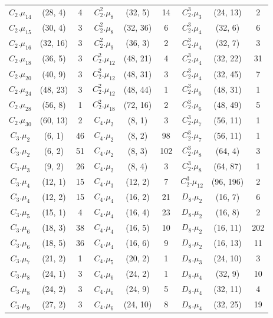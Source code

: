 {\begin{longtable}{ccc|ccc|ccc}
$C_2.\mu_{14}$&(28, 4)&4 & $C_2^2.\mu_{8}$&(32, 5)&14 & $C_2^3.\mu_{3}$&(24, 13)&2\\
\rowcolor{lightgray}
$C_2.\mu_{15}$&(30, 4)&3 & $C_2^2.\mu_{8}$&(32, 36)&6 & $C_2^3.\mu_{4}$&(32, 6)&6\\
$C_2.\mu_{16}$&(32, 16)&3 & $C_2^2.\mu_{9}$&(36, 3)&2 & $C_2^3.\mu_{4}$&(32, 7)&3\\
\rowcolor{lightgray}
$C_2.\mu_{18}$&(36, 5)&3   &  $C_2^2.\mu_{12}$&(48, 21)&4 & $C_2^3.\mu_{4}$&(32, 22)&31\\
$C_2.\mu_{20}$&(40, 9)&3   &  $C_2^2.\mu_{12}$&(48, 31)&3 & $C_2^3.\mu_{4}$&(32, 45)&7\\
\rowcolor{lightgray}
$C_2.\mu_{24}$&(48, 23)&3  &  $C_2^2.\mu_{12}$&(48, 44)&1 & $C_2^3.\mu_{6}$&(48, 31)&1\\
$C_2.\mu_{28}$&(56, 8)&1   &  $C_2^2.\mu_{18}$&(72, 16)&2 & $C_2^3.\mu_{6}$&(48, 49)&5\\
\rowcolor{lightgray}
$C_2.\mu_{30}$&(60, 13)&2  &  $C_4.\mu_{2}$&(8, 1)&3 & $C_2^3.\mu_{7}$&(56, 11)&1\\
$C_3.\mu_{2}$&(6, 1)&46    &  $C_4.\mu_{2}$&(8, 2)&98 & $C_2^3.\mu_{7}$&(56, 11)&1\\
\rowcolor{lightgray}
$C_3.\mu_{2}$&(6, 2)&51    &  $C_4.\mu_{2}$&(8, 3)&102 & $C_2^3.\mu_{8}$&(64, 4)&3\\
$C_3.\mu_{3}$&(9, 2)&26    &  $C_4.\mu_{2}$&(8, 4)&3 & $C_2^3.\mu_{8}$&(64, 87)&1\\
\rowcolor{lightgray}
$C_3.\mu_{4}$&(12, 1)&15   &  $C_4.\mu_{3}$&(12, 2)&7 & $C_2^3.\mu_{12}$&(96, 196)&2\\
$C_3.\mu_{4}$&(12, 2)&15   &  $C_4.\mu_{4}$&(16, 2)&21 & $D_8.\mu_{2}$&(16, 7)&6\\
\rowcolor{lightgray}
$C_3.\mu_{5}$&(15, 1)&4    &  $C_4.\mu_{4}$&(16, 4)&23 & $D_8.\mu_{2}$&(16, 8)&2\\
$C_3.\mu_{6}$&(18, 3)&38   &  $C_4.\mu_{4}$&(16, 5)&10 & $D_8.\mu_{2}$&(16, 11)&202\\
\rowcolor{lightgray}
$C_3.\mu_{6}$&(18, 5)&36   &  $C_4.\mu_{4}$&(16, 6)&9 & $D_8.\mu_{2}$&(16, 13)&11\\
$C_3.\mu_{7}$&(21, 2)&1    &  $C_4.\mu_{5}$&(20, 2)&1 & $D_8.\mu_{3}$&(24, 10)&3\\
\rowcolor{lightgray}
$C_3.\mu_{8}$&(24, 1)&3    &  $C_4.\mu_{6}$&(24, 2)&1 & $D_8.\mu_{4}$&(32, 9)&10\\
$C_3.\mu_{8}$&(24, 2)&3    &  $C_4.\mu_{6}$&(24, 9)&5 & $D_8.\mu_{4}$&(32, 11)&4\\
\rowcolor{lightgray}
$C_3.\mu_{9}$&(27, 2)&3    &  $C_4.\mu_{6}$&(24, 10)&8 & $D_8.\mu_{4}$&(32, 25)&19\\

\end{longtable}}
